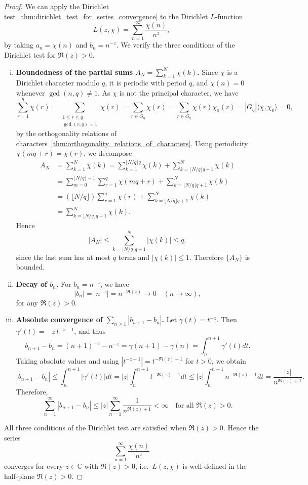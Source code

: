 \documentclass{elegantbook}
\begin{document}
\begin{proof}
  We can apply the Dirichlet test~\ref{thm:dirichlet_test_for_series_convergence} to the Dirichlet $L$-function
  \[
  L(z,\chi)=\sum_{n=1}^{\infty}\frac{\chi(n)}{n^z},
  \]
  by taking \(a_n=\chi(n)\) and \(b_n=n^{-z}\). We verify the three conditions of the Dirichlet test for \(\Re(z)>0\).
  \begin{enumerate}[(i)]
    \item \textbf{Boundedness of the partial sums \(A_N=\sum_{k=1}^{N}\chi(k)\).}
    Since \(\chi\) is a Dirichlet character modulo \(q\), it is periodic with period \(q\), and \(\chi(n)=0\) whenever \(\gcd(n,q)\neq 1\). As \(\chi\) is not the principal character, we have
    \[
      \sum_{r=1}^{q}\chi(r) =\sum_{\substack{1\le r\le q\\ \gcd(r,q)=1}}\chi(r) =\sum_{r\in G_q}\chi(r) =\sum_{r\in G_q}\chi(r)\overline{\chi_0(r)} =|G_q|\langle \chi,\chi_0\rangle =0,
    \]
    by the orthogonality relations of characters~\ref{thm:orthogonality_relations_of_characters}. 
    Using periodicity \(\chi(mq+r)=\chi(r)\), we decompose
    \begin{align*}
      A_N &= \sum_{k=1}^{N}\chi(k) =\sum_{k=1}^{\lfloor N/q \rfloor q}\chi(k) + \sum_{k=\lfloor N/q \rfloor q + 1}^{N}\chi(k) \\
      &=\sum_{m=0}^{\lfloor N/q \rfloor -1}\sum_{r=1}^{q}\chi(mq+r) + \sum_{k=\lfloor N/q \rfloor q + 1}^{N}\chi(k) \\
      &=(\lfloor N/q \rfloor)\sum_{r=1}^{q}\chi(r) + \sum_{k=\lfloor N/q \rfloor q+1}^{N}\chi(k) \\
      &=\sum_{k=\lfloor N/q \rfloor q+1}^{N}\chi(k).
    \end{align*}
    Hence
    \[
      |A_N| \le \sum_{k=\lfloor N/q \rfloor q+1}^{N}|\chi(k)| \le q,
    \]
    since the last sum has at most \(q\) terms and \(|\chi(k)|\le 1\). Therefore \(\{A_N\}\) is bounded.

    \item \textbf{Decay of \(b_n\).}
    For \(b_n=n^{-z}\), we have
    \[
      |b_n|=|n^{-z}|=n^{-\Re(z)}\longrightarrow 0 \quad (n\to\infty),
    \]
    for any \(\Re(z)>0\).

    \item \textbf{Absolute convergence of \(\sum_{n\ge 1}|b_{n+1}-b_n|\).}
    Let \(\gamma(t)=t^{-z}\). Then \(\gamma'(t)=-z\,t^{-z-1}\), and thus
    \[
      b_{n+1}-b_n=(n+1)^{-z}-n^{-z}=\gamma(n+1)-\gamma(n)=\int_n^{n+1}\gamma'(t) dt.
    \]
    Taking absolute values and using \(|t^{-z-1}|=t^{-\Re(z)-1}\) for \(t>0\), we obtain
    \[
      |b_{n+1}-b_n| \le \int_n^{n+1}|\gamma'(t)| dt =|z|\int_n^{n+1} t^{-\Re(z)-1} dt \le |z|\int_n^{n+1} n^{-\Re(z)-1} dt =\frac{|z|}{n^{\Re(z)+1}}.
    \]
    Therefore,
    \[
      \sum_{n=1}^{\infty}|b_{n+1}-b_n| \le |z|\sum_{n=1}^{\infty}\frac{1}{n^{\Re(z)+1}}<\infty \quad\text{for all }\Re(z)>0.
    \]
  \end{enumerate}
  All three conditions of the Dirichlet test are satisfied when \(\Re(z)>0\). Hence the series
  \[
    \sum_{n=1}^{\infty}\frac{\chi(n)}{n^z}
  \]
  converges for every \(z\in\mathbb C\) with \(\Re(z)>0\), i.e.\ \(L(z,\chi)\) is well-defined in the half-plane \(\Re(z)>0\).
\end{proof}
\end{document}
